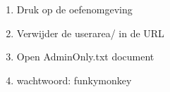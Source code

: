 \begin{enumerate}
  \item Druk op de oefenomgeving
  \item Verwijder de userarea/ in de URL
  \item Open AdminOnly.txt document
  \item wachtwoord: funkymonkey
\end{enumerate}